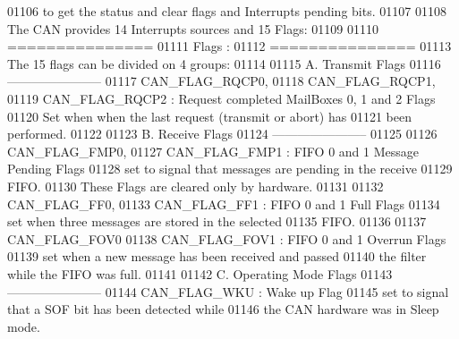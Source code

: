 \begin{DoxyCode}
01106 \textcolor{comment}{  to get the status and clear flags and Interrupts pending bits.}
01107 \textcolor{comment}{  }
01108 \textcolor{comment}{  The CAN provides 14 Interrupts sources and 15 Flags:}
01109 \textcolor{comment}{}
01110 \textcolor{comment}{  ===============  }
01111 \textcolor{comment}{      Flags :}
01112 \textcolor{comment}{  ===============}
01113 \textcolor{comment}{  The 15 flags can be divided on 4 groups: }
01114 \textcolor{comment}{}
01115 \textcolor{comment}{   A. Transmit Flags}
01116 \textcolor{comment}{  -----------------------}
01117 \textcolor{comment}{        CAN\_FLAG\_RQCP0, }
01118 \textcolor{comment}{        CAN\_FLAG\_RQCP1, }
01119 \textcolor{comment}{        CAN\_FLAG\_RQCP2  : Request completed MailBoxes 0, 1 and 2  Flags}
01120 \textcolor{comment}{                          Set when when the last request (transmit or abort) has }
01121 \textcolor{comment}{                          been performed. }
01122 \textcolor{comment}{}
01123 \textcolor{comment}{  B. Receive Flags}
01124 \textcolor{comment}{  -----------------------}
01125 \textcolor{comment}{}
01126 \textcolor{comment}{        CAN\_FLAG\_FMP0,}
01127 \textcolor{comment}{        CAN\_FLAG\_FMP1   : FIFO 0 and 1 Message Pending Flags }
01128 \textcolor{comment}{                          set to signal that messages are pending in the receive }
01129 \textcolor{comment}{                          FIFO.}
01130 \textcolor{comment}{                          These Flags are cleared only by hardware. }
01131 \textcolor{comment}{}
01132 \textcolor{comment}{        CAN\_FLAG\_FF0,}
01133 \textcolor{comment}{        CAN\_FLAG\_FF1    : FIFO 0 and 1 Full Flags}
01134 \textcolor{comment}{                          set when three messages are stored in the selected }
01135 \textcolor{comment}{                          FIFO.                        }
01136 \textcolor{comment}{}
01137 \textcolor{comment}{        CAN\_FLAG\_FOV0              }
01138 \textcolor{comment}{        CAN\_FLAG\_FOV1   : FIFO 0 and 1 Overrun Flags}
01139 \textcolor{comment}{                          set when a new message has been received and passed }
01140 \textcolor{comment}{                          the filter while the FIFO was full.         }
01141 \textcolor{comment}{}
01142 \textcolor{comment}{  C. Operating Mode Flags}
01143 \textcolor{comment}{  ----------------------- }
01144 \textcolor{comment}{        CAN\_FLAG\_WKU    : Wake up Flag}
01145 \textcolor{comment}{                          set to signal that a SOF bit has been detected while }
01146 \textcolor{comment}{                          the CAN hardware was in Sleep mode. }

\end{DoxyCode}
